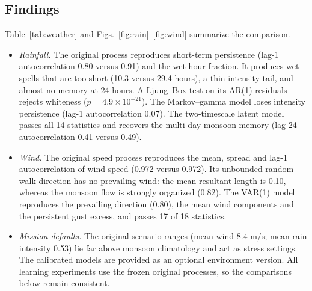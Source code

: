 \documentclass{ieeeaccess}
\begin{document}
\subsection{Findings}
Table~\ref{tab:weather} and Figs.~\ref{fig:rain}--\ref{fig:wind} summarize the comparison.
\begin{itemize}
\item \emph{Rainfall.} The original process reproduces short-term persistence (lag-1 autocorrelation 0.80 versus 0.91) and the wet-hour fraction. It produces wet spells that are too short (10.3 versus 29.4 hours), a thin intensity tail, and almost no memory at 24 hours. A Ljung--Box test \cite{ljung1978} on its AR(1) residuals rejects whiteness ($p=4.9\times10^{-21}$). The Markov--gamma model loses intensity persistence (lag-1 autocorrelation 0.07). The two-timescale latent model passes all 14 statistics and recovers the multi-day monsoon memory (lag-24 autocorrelation 0.41 versus 0.49).
\item \emph{Wind.} The original speed process reproduces the mean, spread and lag-1 autocorrelation of wind speed (0.972 versus 0.972). Its unbounded random-walk direction has no prevailing wind: the mean resultant length is 0.10, whereas the monsoon flow is strongly organized (0.82). The VAR(1) model reproduces the prevailing direction (0.80), the mean wind components and the persistent gust excess, and passes 17 of 18 statistics.
\item \emph{Mission defaults.} The original scenario ranges (mean wind 8.4 m/s; mean rain intensity 0.53) lie far above monsoon climatology and act as stress settings. The calibrated models are provided as an optional environment version. All learning experiments use the frozen original processes, so the comparisons below remain consistent.
\end{itemize}
\end{document}
